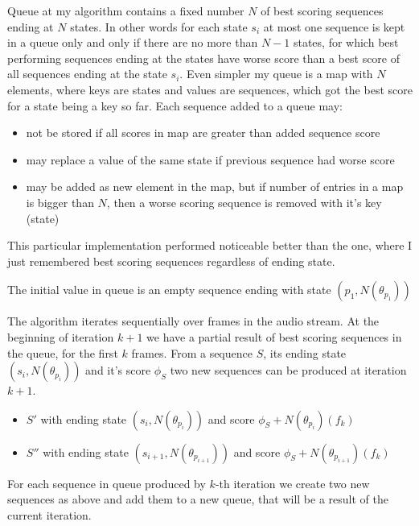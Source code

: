 \documentclass[12pt,a4paper,english]{article}
\begin{document}
Queue at my algorithm contains a fixed number $N$ of best scoring sequences ending at $N$ states. \newline
In other words for each state $s_i$ at most one sequence is kept in a queue only and only if there are no more than $N-1$ states, for which best performing sequences ending at the states have worse score than a best score of all sequences ending at the state $s_i$. \newline
Even simpler my queue is a map with $N$ elements, where keys are states and values are sequences, which got the best score for a state being a key so far. \newline
Each sequence added to a queue may:
\begin{itemize}
    \item not be stored if all scores in map are greater than added sequence score
    \item may replace a value of the same state if previous sequence had worse score
    \item may be added as new element in the map, but if number of entries in a map is bigger than $N$, then a worse scoring sequence is removed with it's key (state)
\end{itemize}
This particular implementation performed noticeable better than the one, where I just remembered best scoring sequences regardless of ending state. \newline

The initial value in queue is an empty sequence ending with state $(p_1, N(\theta_{p_1}))$

\newpage

The algorithm iterates sequentially over frames in the audio stream. \newline
At the beginning of iteration $k+1$ we have a partial result of best scoring sequences in the queue, for the first $k$ frames. \newline
From a sequence $S$, its ending state $(s_i, N(\theta_{p_i}))$ and it's score $\phi_S$ two new sequences can be produced at iteration $k+1$. 
\begin{itemize}
    \item $S'$ with ending state $(s_i, N(\theta_{p_i}))$ and score $\phi_S + N(\theta_{p_i})(f_k)$
    \item $S''$ with ending state $(s_{i+1}, N(\theta_{p_{i+1}}))$ and score $\phi_S+N(\theta_{p_{i+1}})(f_k)$
\end{itemize}
For each sequence in queue produced by $k$-th iteration we create two new sequences as above and add them to a new queue, that will be a result of the current iteration. \newline
\end{document}
